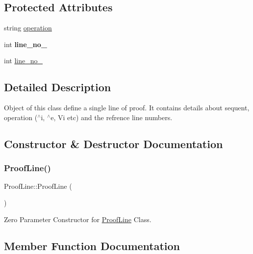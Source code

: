 \subsection*{Protected Attributes}
\begin{DoxyCompactItemize}
\item 
string \hyperlink{classProofLine_a45395cbc2a93d336cfd867b343bc27a7}{operation}
\item 
\mbox{\label{classProofLine_a398ea46def0f627b9eadd1564f9c873d}} 
int {\bfseries line\+\_\+no\+\_}
\item 
int \hyperlink{classProofLine_a7bf8a305e7ad620013a2ebb0388e2531}{line\+\_\+no\+\_}
\end{DoxyCompactItemize}


\subsection{Detailed Description}
Object of this class define a single line of proof. It contains details about sequent, operation ($^\wedge$i, $^\wedge$e, Vi etc) and the refrence line numbers. 

\subsection{Constructor \& Destructor Documentation}
\mbox{\label{classProofLine_aed683fe67d959f3b95f8975e80b23d66}} 
\subsubsection{\texorpdfstring{Proof\+Line()}{ProofLine()}}
{\footnotesize\ttfamily Proof\+Line\+::\+Proof\+Line (\begin{DoxyParamCaption}{ }\end{DoxyParamCaption})\hspace{0.3cm}{\ttfamily [inline]}}

Zero Parameter Constructor for \hyperlink{classProofLine}{Proof\+Line} Class. 

\subsection{Member Function Documentation}
\mbox{\label{classProofLine_a43b9c81f4f9be5f00343f5145110e075}} 
